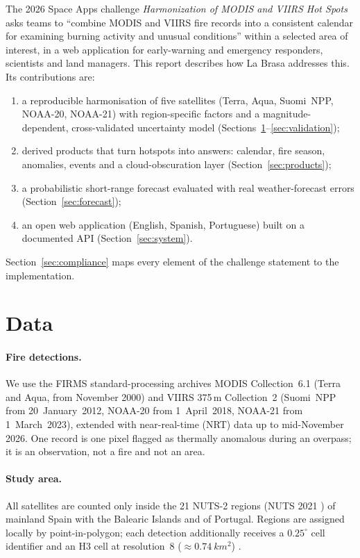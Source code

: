 \documentclass[11pt,a4paper]{article}
\begin{document}
The 2026 Space Apps challenge \emph{Harmonization of MODIS and VIIRS Hot Spots} asks teams to
``combine MODIS and VIIRS fire records into a consistent calendar for examining burning activity and
unusual conditions'' within a selected area of interest, in a web application for early-warning and
emergency responders, scientists and land managers. This report describes how La Brasa addresses this.
Its contributions are:
\begin{enumerate}
  \item a reproducible harmonisation of five satellites (Terra, Aqua, Suomi~NPP, NOAA-20, NOAA-21) with
        region-specific factors and a magnitude-dependent, cross-validated uncertainty model
        (Sections~\ref{sec:data}--\ref{sec:validation});
  \item derived products that turn hotspots into answers: calendar, fire season, anomalies, events and a
        cloud-obscuration layer (Section~\ref{sec:products});
  \item a probabilistic short-range forecast evaluated with real weather-forecast errors
        (Section~\ref{sec:forecast});
  \item an open web application (English, Spanish, Portuguese) built on a documented API
        (Section~\ref{sec:system}).
\end{enumerate}
Section~\ref{sec:compliance} maps every element of the challenge statement to the implementation.

\section{Data}\label{sec:data}

\paragraph{Fire detections.}
We use the FIRMS standard-processing archives MODIS Collection~6.1 (Terra and Aqua, from November 2000)
and VIIRS 375\,m Collection~2 (Suomi~NPP from 20~January~2012, NOAA-20 from 1~April~2018, NOAA-21 from
1~March~2023), extended with near-real-time (NRT) data up to mid-November 2026. One record is one pixel
flagged as thermally anomalous during an overpass; it is an observation, not a fire and not an area.

\paragraph{Study area.}
All satellites are counted only inside the 21 NUTS-2 regions (NUTS 2021 \cite{nuts2021}) of mainland Spain
with the Balearic Islands and of Portugal. Regions are assigned locally by point-in-polygon; each
detection additionally receives a $0.25^\circ$ cell identifier and an H3 cell at resolution~8
($\approx\SI{0.74}{km^2}$) \cite{h3}.
\end{document}
